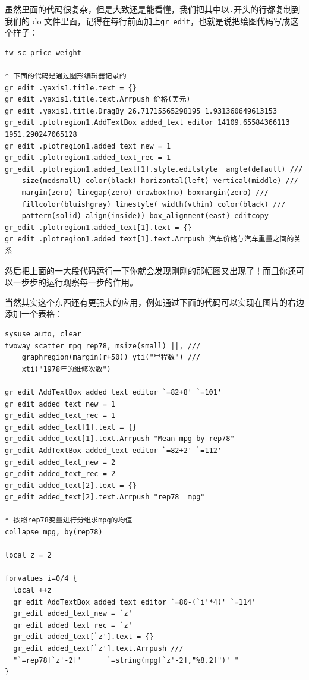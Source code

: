 \documentclass[cn,fancy,blue,11pt]{elegantbook}
\begin{document}
虽然里面的代码很复杂，但是大致还是能看懂，我们把其中以\lstinline{.}开头的行都复制到我们的 do 文件里面，记得在每行前面加上\lstinline{gr_edit}，也就是说把绘图代码写成这个样子：

\begin{lstlisting}
tw sc price weight

* 下面的代码是通过图形编辑器记录的
gr_edit .yaxis1.title.text = {}
gr_edit .yaxis1.title.text.Arrpush 价格(美元)
gr_edit .yaxis1.title.DragBy 26.71715565298195 1.931360649613153
gr_edit .plotregion1.AddTextBox added_text editor 14109.65584366113 1951.290247065128
gr_edit .plotregion1.added_text_new = 1
gr_edit .plotregion1.added_text_rec = 1
gr_edit .plotregion1.added_text[1].style.editstyle  angle(default) ///
    size(medsmall) color(black) horizontal(left) vertical(middle) ///
    margin(zero) linegap(zero) drawbox(no) boxmargin(zero) ///
    fillcolor(bluishgray) linestyle( width(vthin) color(black) ///
    pattern(solid) align(inside)) box_alignment(east) editcopy
gr_edit .plotregion1.added_text[1].text = {}
gr_edit .plotregion1.added_text[1].text.Arrpush 汽车价格与汽车重量之间的关系
\end{lstlisting}

然后把上面的一大段代码运行一下你就会发现刚刚的那幅图又出现了！而且你还可以一步步的运行观察每一步的作用。

当然其实这个东西还有更强大的应用，例如通过下面的代码可以实现在图片的右边添加一个表格：

\begin{lstlisting}
sysuse auto, clear
twoway scatter mpg rep78, msize(small) ||, ///
    graphregion(margin(r+50)) yti("里程数") ///
    xti("1978年的维修次数")

gr_edit AddTextBox added_text editor `=82+8' `=101'
gr_edit added_text_new = 1
gr_edit added_text_rec = 1
gr_edit added_text[1].text = {}
gr_edit added_text[1].text.Arrpush "Mean mpg by rep78"
gr_edit AddTextBox added_text editor `=82+2' `=112'
gr_edit added_text_new = 2
gr_edit added_text_rec = 2
gr_edit added_text[2].text = {}
gr_edit added_text[2].text.Arrpush "rep78  mpg"

* 按照rep78变量进行分组求mpg的均值
collapse mpg, by(rep78)

local z = 2

forvalues i=0/4 {
  local ++z
  gr_edit AddTextBox added_text editor `=80-(`i'*4)' `=114'
  gr_edit added_text_new = `z'
  gr_edit added_text_rec = `z'
  gr_edit added_text[`z'].text = {}
  gr_edit added_text[`z'].text.Arrpush ///
  "`=rep78[`z'-2]'      `=string(mpg[`z'-2],"%8.2f")' "
}
\end{lstlisting}
\end{document}
